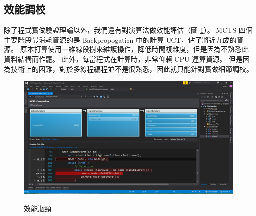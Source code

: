 \documentclass[12pt]{article}
\begin{document}
\begin{CJK}{UTF8}{bsmi}
\section{效能調校}
除了程式實做驗證理論以外，我們還有對演算法做效能評估（圖 \ref{performance}）。
MCTS 四個主要階段最消耗資源的是 Backpropogation 中的計算 UCT，佔了將近九成的資源。
原本打算使用一維線段樹來維護操作，降低時間複雜度，但是因為不熟悉此資料結構而作罷。
此外，每當程式在計算時，非常仰賴 CPU 運算資源。
但是因為技術上的困難，對於多線程編程並不是很熟悉，因此就只能針對實做細節調校。

\begin{figure}
  \caption{效能瓶頸}
  \centering
  \includegraphics[width=1.2\textwidth]{performance}
  \label{performance}
\end{figure}



\end{CJK}
\end{document}
